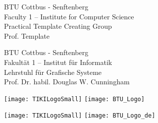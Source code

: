 %
%
%
\begin{en}
\end{en}
\begin{de}
\end{de}
%
\thispagestyle{empty}
%
%
\begin{figure}[ht]
\begin{minipage}[l]{0.60\textwidth}
\begin{flushleft}	
\begin{en}
	BTU Cottbus - Senftenberg\\[0.3em]
    Faculty 1 -- Institute for Computer Science\\[0.3em]
    Practical Template Creating Group\\[0.3em]
    Prof. Template
\end{en}
\begin{de}
    BTU Cottbus - Senftenberg\\[0.3em]
    Fakult\"at 1 -- Institut f\"ur Informatik\\[0.3em]
    Lehrstuhl f\"ur Grafische Systeme\\[0.3em]
    Prof. Dr. habil. Douglas W. Cunningham
\end{de}
\end{flushleft}	
\end{minipage}%
\begin{minipage}[r]{0.4\textwidth}
\begin{flushright}	
\begin{en}
	\texttt{[image: TIKILogoSmall]}
	\texttt{[image: BTU\_Logo]}
\end{en}
\begin{de}
	\texttt{[image: TIKILogoSmall]}
	\texttt{[image: BTU\_Logo\_de]}
\end{de}
\end{flushright}	
\end{minipage} 
\end{figure}
